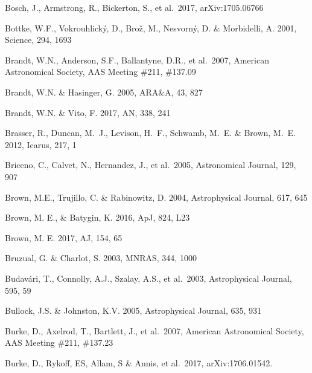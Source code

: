 \documentclass[twocolumn]{aastex61}
\begin{document}
\begin{thebibliography}{}

 Bosch, J., Armstrong, R., Bickerton, S., et al.~2017,  arXiv:1705.06766

 Bottke, W.F., Vokrouhlick\'{y}, D., Bro\v{z}, M., Nesvorn\'y, D. \& Morbidelli, A. 2001, Science, 294, 1693

 Brandt, W.N., Anderson, S.F., Ballantyne, D.R., et al.~2007, American Astronomical Society, AAS Meeting \#211, \#137.09

 Brandt, W.N. \& Hasinger, G. 2005, ARA\&A, 43, 827

 Brandt, W.N. \& Vito, F. 2017, AN, 338, 241

 Brasser, R., Duncan, M.~J., Levison, H.~F., Schwamb, M.~E. \& Brown, M.~E. 2012, Icarus, 217, 1

 Briceno, C., Calvet, N., Hernandez, J., et al.~2005, Astronomical Journal, 129, 907

 Brown, M.E., Trujillo, C. \& Rabinowitz, D. 2004, Astrophysical Journal, 617, 645

 Brown, M. E., \& Batygin, K. 2016, ApJ, 824, L23

 Brown, M. E. 2017, AJ, 154, 65

 Bruzual, G. \& Charlot, S. 2003, MNRAS, 344, 1000

 Budav\'{a}ri, T., Connolly, A.J., Szalay, A.S., et al.~2003, Astrophysical Journal, 595, 59

 Bullock, J.S. \& Johnston, K.V. 2005,  Astrophysical Journal, 635, 931

 Burke, D., Axelrod, T., Bartlett, J., et al.~2007, American Astronomical Society, AAS Meeting \#211, \#137.23

 Burke, D., Rykoff, ES, Allam, S \& Annis, et al.~2017, arXiv:1706.01542.


\end{thebibliography}
\end{document}
